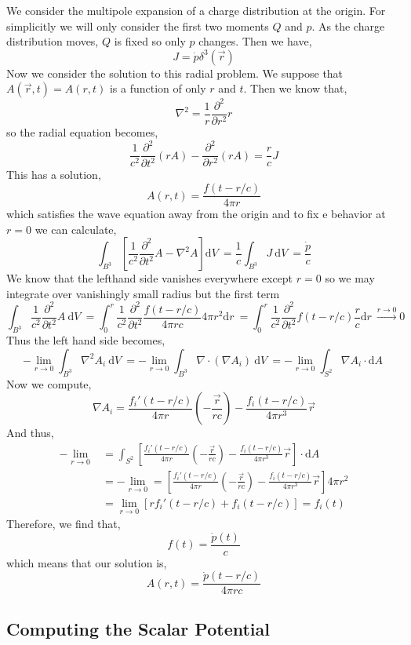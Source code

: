 \documentclass[12pt]{extarticle}
\renewcommand{\d}[1]{ \mathrm{d}#1 \:}
\newcommand{\npar}[3]{\frac{\partial^{#1}{#2}}{\partial{#3}^{#1}}}
\theoremstyle{definition}
\begin{document}
We consider the multipole expansion of a charge distribution at the origin. For simplicitly we will only consider the first two moments $Q$ and $p$. As the charge distribution moves, $Q$ is fixed so only $p$ changes. Then we have,
\[ J = \dot{p} \delta^3(\vec{r}) \]
Now we consider the solution to this radial problem. We suppose that $A(\vec{r}, t) = A(r, t)$ is a function of only $r$ and $t$. Then we know that,
\[ \nabla^2 = \frac{1}{r} \npar{2}{}{r} r \]
so the radial equation becomes,
\[ \frac{1}{c^2} \npar{2}{}{t} (rA) - \npar{2}{}{r} (rA) = \frac{r}{c} J \]
This has a solution,
\[ A(r,t) = \frac{f(t - r/c)}{4 \pi r} \]
which satisfies the wave equation away from the origin and to fix e behavior at $r = 0$ we can calculate,
\[ \int_{B^3} \left[ \frac{1}{c^2} \npar{2}{}{t} A - \nabla^2 A \right] \d{V} = \frac{1}{c} \int_{B^3} J \: \d{V} = \frac{\dot{p}}{c} \]
We know that the lefthand side vanishes everywhere except $r = 0$ so we may integrate over vanishingly small radius but the first term
\[ \int_{B^3} \frac{1}{c^2} \npar{2}{}{t} A \: \d{V} = \int_0^r \frac{1}{c^2} \npar{2}{}{t} \frac{f(t - r/c)}{4 \pi r c} 4 \pi r^2 \d{r} = \int_0^r \frac{1}{c^2} \npar{2}{}{t} f(t - r/c) \frac{r}{c} \d{r}  \xrightarrow{r \to 0} 0 \]
Thus the left hand side becomes,
\[ - \lim_{r \to 0} \int_{B^3} \nabla^2 A_i \: \d{V} = - \lim_{r \to 0}  \int_{B^3} \nabla \cdot (\nabla A_i) \: \d{V} = - \lim_{r \to 0} \int_{S^2} \nabla A_i \cdot \d{A} \]
Now we compute,
\[ \nabla A_i = \frac{f_i'(t - r/c)}{4 \pi r} (- \frac{\vec{r}}{rc}) - \frac{f_i(t - r/c)}{4 \pi r^3} \vec{r} \]
And thus,
\begin{align*}
- \lim_{r \to 0} & = \int_{S^2} \left[ \frac{f_i'(t - r/c)}{4 \pi r} (- \frac{\vec{r}}{rc}) - \frac{f_i(t - r/c)}{4 \pi r^3} \vec{r} \right]  \cdot \d{A} 
\\
& = - \lim_{r \to 0} = \left[ \frac{f_i'(t - r/c)}{4 \pi r} (- \frac{\vec{r}}{rc}) - \frac{f_i(t - r/c)}{4 \pi r^3} \vec{r} \right]  4 \pi r^2
\\
& = \lim_{r \to 0} [ r f_i'(t - r/c) + f_i(t - r / c) ] = f_i(t) 
\end{align*}
Therefore, we find that,
\[ f(t) = \frac{\dot{p}(t)}{c} \]
which means that our solution is,
\[ A(r, t) = \frac{\dot{p}(t - r/c)}{4 \pi r c} \]

\subsection{Computing the Scalar Potential}
\end{document}

